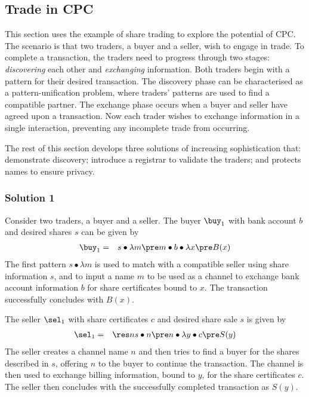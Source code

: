 \documentclass{LMCS}
\begin{document}
\subsection{Trade in CPC}
\label{subsec:cpc-trade}

This section uses the example of share trading to explore the
potential of CPC. The scenario is that two  traders, a buyer
and a seller, wish to engage in trade. To complete a transaction, the
traders need to progress through two stages: {\em discovering} each
other and {\em exchanging} information. Both traders begin with a
pattern for their desired transaction.
The discovery phase can be characterised as a pattern-unification
problem, where traders' patterns are used to find a compatible
partner.
The exchange phase occurs when a buyer and seller have agreed upon a
transaction. Now each trader wishes to exchange information in a
single interaction, preventing any incomplete trade from occurring.

The rest of this section develops three solutions of increasing
sophistication that: demonstrate discovery; introduce a registrar to
validate the traders; and protects names to ensure privacy.
\enlargethispage{\baselineskip}

\subsubsection*{Solution 1}
\label{sec:example:sol1}
Consider two traders, a buyer and a seller. The buyer $\buy_1$ with
bank account $b$ and desired shares $s$ can be given by
\begin{eqnarray*}
\buy_1 &=& s\bullet\lambda m \pre m\bullet b\bullet \lambda x \pre B(x)
\end{eqnarray*}
The first pattern $s\bullet \lambda m$ is used to match with a
compatible seller using share information $s$, and to input a name $m$
to be used as a channel to exchange bank account information $b$ for
share certificates bound to $x$. The transaction successfully
concludes with $B(x)$.

The seller $\sel_1$ with share certificates $c$ and desired share sale
$s$ is given by
\begin{eqnarray*}
\sel_1 &=& \res n s\bullet n\pre n\bullet \lambda y\bullet c\pre S(y) 
\end{eqnarray*}
The seller creates a channel name $n$ and then tries to find a buyer
for the shares described in $s$, offering $n$ to the buyer to
continue the transaction. The channel is then used to exchange
billing information, bound to $y$, for the share certificates $c$.
The seller then concludes with the successfully completed transaction
as $S(y)$.
\end{document}
